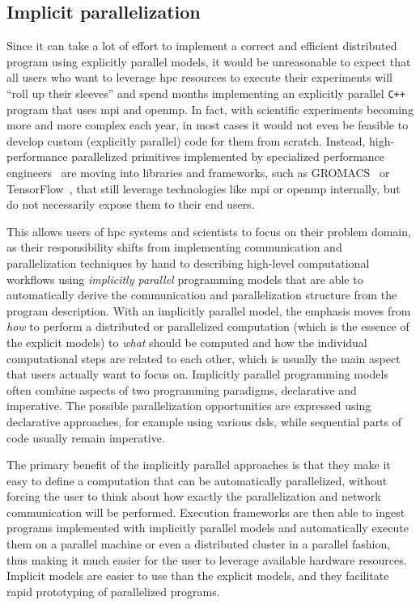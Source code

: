 \subsection*{Implicit parallelization}
Since it can take a lot of effort to implement a correct and efficient distributed program using
explicitly parallel models, it would be unreasonable to expect that all users who want to leverage
\gls{hpc} resources to execute their experiments will ``roll up their sleeves'' and
spend months implementing an explicitly parallel \texttt{C++} program that uses
\gls{mpi} and \gls{openmp}. In fact, with scientific experiments becoming
more and more complex each year, in most cases it would not even be feasible to develop custom
(explicitly parallel) code for them from scratch. Instead, high-performance parallelized primitives
implemented by specialized performance engineers~\cite{dace} are moving into libraries
and frameworks, such as GROMACS~\cite{gromacs,gromacs_mpi} or TensorFlow~\cite{tensorflow,horovod}, that
still leverage technologies like \gls{mpi} or \gls{openmp} internally, but
do not necessarily expose them to their end users.

This allows users of \gls{hpc} systems and scientists to focus on their problem
domain, as their responsibility shifts from implementing communication and parallelization
techniques by hand to describing high-level computational workflows using \emph{implicitly parallel}
programming models that are able to automatically derive the communication and parallelization
structure from the program description. With an implicitly parallel model, the emphasis moves from
\emph{how} to perform a distributed or parallelized computation (which is the essence
of the explicit models) to \emph{what} should be computed and how the individual
computational steps are related to each other, which is usually the main aspect that users actually
want to focus on. Implicitly parallel programming models often combine aspects of two programming
paradigms, declarative and imperative. The possible parallelization opportunities are expressed
using declarative approaches, for example using various \glspl{dsl}, while sequential
parts of code usually remain imperative.

The primary benefit of the implicitly parallel approaches is that they make it easy to define a
computation that can be automatically parallelized, without forcing the user to think about how
exactly the parallelization and network communication will be performed. Execution frameworks are
then able to ingest programs implemented with implicitly parallel models and automatically execute
them on a parallel machine or even a distributed cluster in a parallel fashion, thus making it much
easier for the user to leverage available hardware resources. Implicit models are easier to use
than the explicit models, and they facilitate rapid prototyping of parallelized programs.

